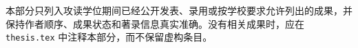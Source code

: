 \begin{publication}
本部分只列入攻读学位期间已经公开发表、录用或按学校要求允许列出的成果，并保持作者顺序、成果状态和著录信息真实准确。没有相关成果时，应在 \texttt{thesis.tex} 中注释本部分，而不保留虚构条目。
\end{publication}
